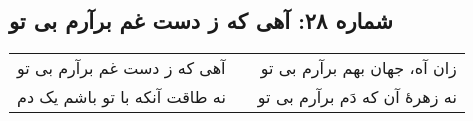 \begin{center}
\section*{شماره ۲۸: آهی که ز دست غم برآرم بی تو}
\label{sec:028}
\begin{longtable}{l p{0.5cm} r}
آهی که ز دست غم برآرم بی تو
&&
زان آه، جهان بهم برآرم بی تو
\\
نه طاقت آنکه با تو باشم یک دم
&&
نه زهرهٔ آن که دَم برآرم بی تو
\\
\end{longtable}
\end{center}
